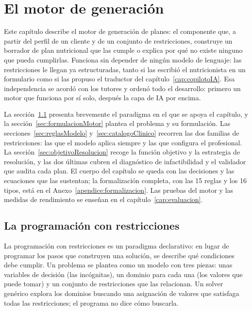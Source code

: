 \chapter{El motor de generación}
\label{cap:motorGeneracion}

Este capítulo describe el motor de generación de planes: el componente que, a partir del perfil de un cliente y de un conjunto de restricciones, construye un borrador de plan nutricional que las cumple o explica por qué no existe ninguno que pueda cumplirlas. Funciona sin depender de ningún modelo de lenguaje: las restricciones le llegan ya estructuradas, tanto si las escribió el nutricionista en un formulario como si las propuso el traductor del capítulo~\ref{cap:copilotoIA}. Esa independencia se acordó con los tutores y ordenó todo el desarrollo: primero un motor que funciona por sí solo, después la capa de IA por encima.

La sección~\ref{sec:introCP} presenta brevemente el paradigma en el que se apoya el capítulo, y la sección~\ref{sec:formulacionMotor} plantea el problema y su formulación. Las secciones~\ref{sec:reglasModelo} y~\ref{sec:catalogoClinico} recorren las dos familias de restricciones: las que el modelo aplica siempre y las que configura el profesional. La sección~\ref{sec:objetivoResolucion} recoge la función objetivo y la estrategia de resolución, y las dos últimas cubren el diagnóstico de infactibilidad y el validador que audita cada plan. El cuerpo del capítulo se queda con las decisiones y las ecuaciones que las sustentan; la formalización completa, con las 15 reglas y los 16 tipos, está en el Anexo~\ref{apendice:formalizacion}. Las pruebas del motor y las medidas de rendimiento se enseñan en el capítulo~\ref{cap:evaluacion}.

\section{La programación con restricciones}
\label{sec:introCP}

La programación con restricciones es un paradigma declarativo: en lugar de programar los pasos que construyen una solución, se describe qué condiciones debe cumplir. Un problema se plantea como un modelo con tres piezas: unas variables de decisión (las incógnitas), un dominio para cada una (los valores que puede tomar) y un conjunto de restricciones que las relacionan. Un solver genérico explora los dominios buscando una asignación de valores que satisfaga todas las restricciones; el programa no dice cómo buscarla.


